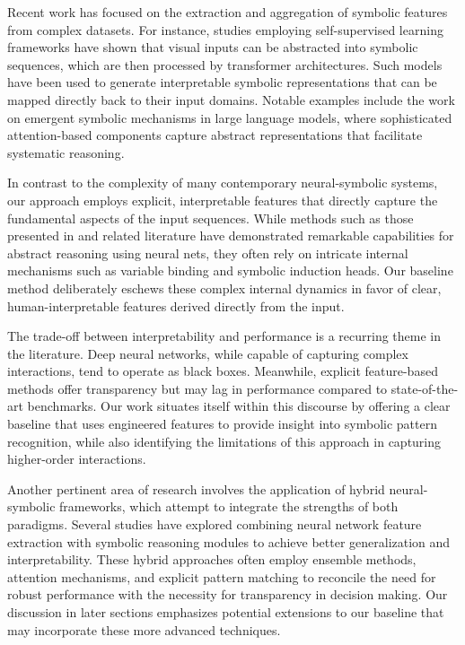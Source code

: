 \documentclass{article}
\begin{document}
Recent work has focused on the extraction and aggregation of symbolic features from complex datasets. For instance, studies employing self-supervised learning frameworks have shown that visual inputs can be abstracted into symbolic sequences, which are then processed by transformer architectures. Such models have been used to generate interpretable symbolic representations that can be mapped directly back to their input domains. Notable examples include the work on emergent symbolic mechanisms in large language models, where sophisticated attention-based components capture abstract representations that facilitate systematic reasoning.

In contrast to the complexity of many contemporary neural-symbolic systems, our approach employs explicit, interpretable features that directly capture the fundamental aspects of the input sequences. While methods such as those presented in \cite{yang2025emergent} and related literature have demonstrated remarkable capabilities for abstract reasoning using neural nets, they often rely on intricate internal mechanisms such as variable binding and symbolic induction heads. Our baseline method deliberately eschews these complex internal dynamics in favor of clear, human-interpretable features derived directly from the input.

The trade-off between interpretability and performance is a recurring theme in the literature. Deep neural networks, while capable of capturing complex interactions, tend to operate as black boxes. Meanwhile, explicit feature-based methods offer transparency but may lag in performance compared to state-of-the-art benchmarks. Our work situates itself within this discourse by offering a clear baseline that uses engineered features to provide insight into symbolic pattern recognition, while also identifying the limitations of this approach in capturing higher-order interactions.

Another pertinent area of research involves the application of hybrid neural-symbolic frameworks, which attempt to integrate the strengths of both paradigms. Several studies have explored combining neural network feature extraction with symbolic reasoning modules to achieve better generalization and interpretability. These hybrid approaches often employ ensemble methods, attention mechanisms, and explicit pattern matching to reconcile the need for robust performance with the necessity for transparency in decision making. Our discussion in later sections emphasizes potential extensions to our baseline that may incorporate these more advanced techniques.
\end{document}
